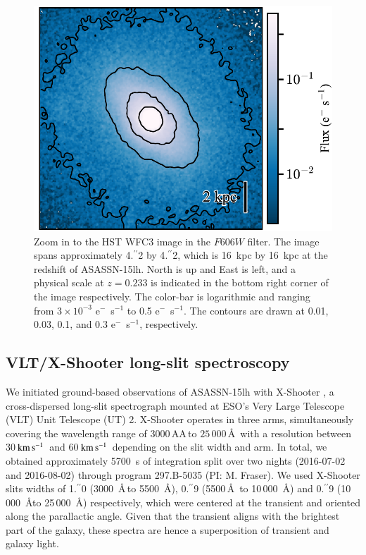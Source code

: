 \documentclass[traditabstract]{aa}
\newcommand{\farc}{\hbox{$.\!\!^{\prime\prime}$}}
\newcommand{\kms}{$\rm{km\,s^{-1}}$}
\begin{document}
\begin{figure}
  \includegraphics[width=0.999\linewidth]{fig/WFC3_ASASSN-15lh_wfc2.pdf}
\caption{Zoom in to the HST WFC3 image in the $F606W$ filter. The image spans approximately 4\farc{2} by 4\farc{2}, which is 16~kpc by 16~kpc at the redshift of ASASSN-15lh. North is up and East is left, and a physical scale at $z=0.233$ is indicated in the bottom right corner of the image respectively. The color-bar is logarithmic and ranging from $3\times10^{-3}$ e$^{-}$~s$^{-1}$ to 0.5 e$^{-}$~s$^{-1}$. The contours are drawn at 0.01, 0.03, 0.1, and 0.3 e$^{-}$~s$^{-1}$, respectively.}
\label{fig:fczoom}
\end{figure}



\subsection{VLT/X-Shooter long-slit spectroscopy}
\label{obs:xs}

We initiated ground-based observations of ASASSN-15lh with X-Shooter \citep{2011A&A...536A.105V}, a cross-dispersed long-slit spectrograph mounted at ESO's Very Large Telescope (VLT) Unit Telescope (UT) 2. X-Shooter operates in three arms, simultaneously covering the wavelength range of $3000$\,AA\,to $25\,000$\,\AA\, with a resolution between 30\,\kms\, and 60\,\kms\, depending on the slit width and arm. In total, we obtained approximately 5700~s of integration split over two nights (2016-07-02 and 2016-08-02) through program 297.B-5035 (PI: M. Fraser). We used X-Shooter slits widths of 1\farc{0} (3000~\AA\,to 5500~\AA), 0\farc{9} (5500\,\AA~to 10\,000~\AA) and  0\farc{9} (10\,000~\AA to 25\,000~\AA) respectively, which were centered at the transient and oriented along the parallactic angle. Given that the transient aligns with the brightest part of the galaxy, these spectra are hence a superposition of transient and galaxy light.
\end{document}
